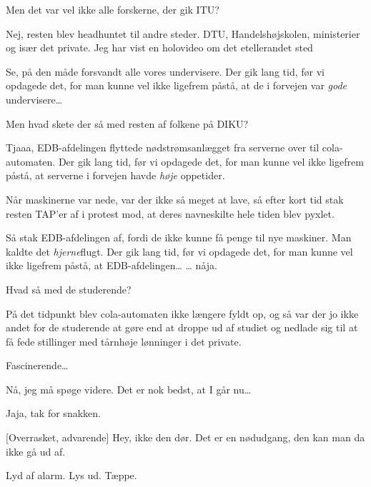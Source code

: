 \documentclass[danish]{article}
\begin{document}
\begin{sketch}
 Men det var vel ikke alle forskerne, der gik ITU?

 Nej, resten blev headhuntet til andre steder. DTU, Handelshøjskolen,
   ministerier og især det private. Jeg har vist en holovideo om det
   etellerandet sted 

 

 Se, på den måde forsvandt alle vores undervisere. Der gik lang tid, før
   vi opdagede det, for man kunne vel ikke ligefrem påstå, at de i forvejen var
   \emph{gode} undervisere\ldots{}
   
 Men hvad skete der så med resten af folkene på DIKU?

 Tjaaa, EDB-afdelingen flyttede nødstrømsanlægget fra serverne over til
   cola-automaten. Der gik lang tid, før vi opdagede det, for man kunne vel ikke
   ligefrem påstå, at serverne i forvejen havde \emph{høje} oppetider.

   Når maskinerne var nede, var der ikke så meget at lave, så efter kort tid
   stak resten TAP'er af i protest mod, at deres navneskilte hele tiden blev
   pyxlet.

   Så stak EDB-afdelingen af, fordi de ikke kunne få penge til nye maskiner. Man
   kaldte det \emph{hjerne}flugt. Der gik lang tid, før vi opdagede det, for man
   kunne vel ikke ligefrem påstå, at EDB-afdelingen\ldots{} \ldots{}
   nåja.

 Hvad så med de studerende?

 På det tidpunkt blev cola-automaten ikke længere fyldt op, og så var der jo
   ikke andet for de studerende at gøre end at droppe ud af studiet og nedlade
   sig til at få fede stillinger med tårnhøje lønninger i det private.

 Fascinerende\ldots{}

 Nå, jeg må spøge videre. Det er nok bedst, at I går nu\ldots{}

 Jaja, tak for snakken. 

[Overrasket, advarende] Hey, ikke den dør. Det er en nødudgang, den kan
  man da ikke gå ud af.

\scene Lyd af alarm. Lys ud. Tæppe.

\end{sketch}
\end{document}
